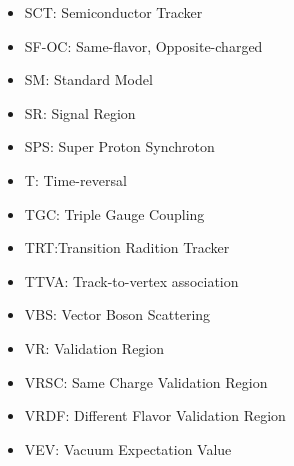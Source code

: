 \begin{itemize}
\item{SCT: Semiconductor Tracker} 
\item{SF-OC: Same-flavor, Opposite-charged} 
\item{SM: Standard Model}
\item{SR: Signal Region}
\item{SPS: Super Proton Synchroton} 
\item{T: Time-reversal}
\item{TGC: Triple Gauge Coupling}
\item{TRT:Transition Radition Tracker} 
\item{TTVA: Track-to-vertex association}
\item{VBS: Vector Boson Scattering}
\item{VR: Validation Region}
\item{VRSC: Same Charge Validation Region}
\item{VRDF: Different Flavor Validation Region}
\item{VEV: Vacuum Expectation Value}
\end{itemize}
